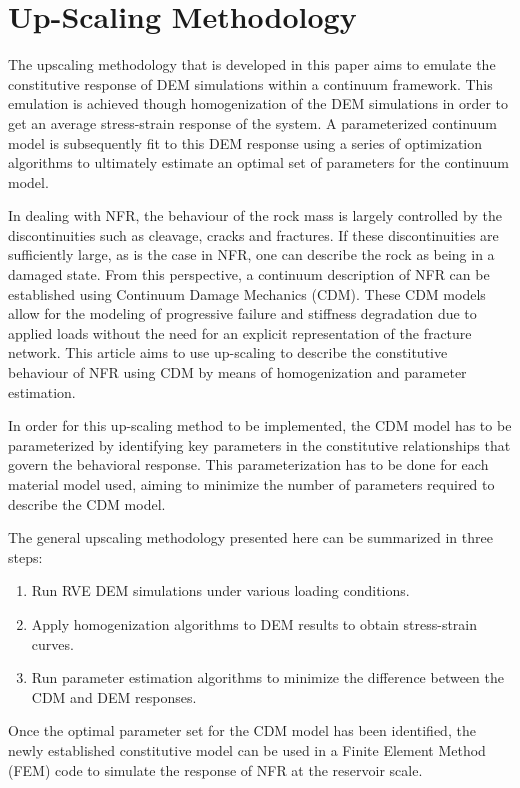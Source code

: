 \section{Up-Scaling Methodology}
The upscaling methodology that is developed in this paper aims to emulate the constitutive response of DEM simulations within a continuum framework. This emulation is achieved though homogenization of the DEM simulations in order to get an average stress-strain response of the system. A parameterized continuum model is subsequently fit to this DEM response using a series of optimization algorithms to ultimately estimate an optimal set of parameters for the continuum model.


In dealing with NFR, the behaviour of the rock mass is largely controlled by the discontinuities such as cleavage, cracks and fractures. If these discontinuities are sufficiently large, as is the case in NFR, one can describe the rock as being in a damaged state. From this perspective, a continuum description of NFR can be  established using Continuum Damage Mechanics (CDM). These CDM models allow for the modeling of progressive failure and stiffness degradation due to applied loads without the need for an explicit representation of the fracture network. This article aims to use up-scaling to describe the constitutive behaviour of NFR using CDM by means of homogenization and parameter estimation. 

In order for this  up-scaling method to be implemented, the CDM model has to be parameterized by identifying key parameters in the constitutive relationships that govern the behavioral response. This parameterization has to be done for each material model used, aiming to minimize the number of parameters required to describe the CDM model. 

The general upscaling methodology presented here can be summarized in three steps:
\begin{enumerate}
	\item Run RVE DEM simulations under various loading conditions.
	\item Apply homogenization algorithms to DEM results to obtain stress-strain curves.
	\item Run parameter estimation algorithms to minimize the difference between the CDM and DEM responses.
\end{enumerate}
Once the optimal parameter set for the CDM model has been identified, the newly established constitutive model can be used in a Finite Element Method (FEM) code to simulate the response of NFR at the reservoir scale.


